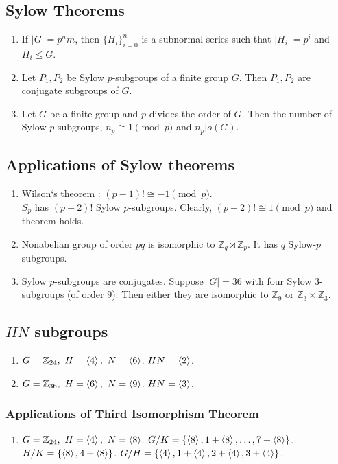 \subsection{Sylow Theorems}
\begin{enumerate}
	\item If $|G|=p^nm$, then $\{ H_i \}_{i=0}^n$ is a subnormal series such that $|H_i| = p^i$ and $H_i \le G$.
	\item Let $P_1,P_2$ be Sylow $p$-subgroups of a finite group $G$. Then $P_1,P_2$ are conjugate subgroups of $G$.
	\item Let $G$ be a finite group and $p$ divides the order of $G$.
	Then the number of Sylow $p$-subgroups, $n_p \cong 1 \pmod{p}$ and $n_p|o(G)$.
\end{enumerate}

\subsection{Applications of Sylow theorems}
\begin{enumerate}
	\item Wilson`s theorem : $(p-1)! \cong -1 \pmod{p}$.\\
	$S_p$ has $(p-2)!$ Sylow $p$-subgroups.
	Clearly, $(p-2)! \cong 1 \pmod{p}$ and theorem holds.
	\item Nonabelian group of order $pq$ is isomorphic to $\mathbb{Z}_q \rtimes \mathbb{Z}_p$. It has $q$ Sylow-$p$ subgroups.
	\item Sylow $p$-subgroups are conjugates.
		Suppose $|G|=36$ with four Sylow $3$-subgroups (of order $9$). Then either they are isomorphic to $\mathbb{Z}_9$ or $\mathbb{Z}_3 \times \mathbb{Z}_3$.
\end{enumerate}

\subsection{$HN$ subgroups}
\begin{enumerate}
	\item $G = \mathbb{Z}_{24},\ H = \left\langle 4 \right\rangle,\ N = \left\langle 6 \right\rangle$. $HN = \left\langle 2 \right\rangle$.
	\item $G = \mathbb{Z}_{36},\ H = \left\langle 6 \right\rangle,\ N = \left\langle 9 \right\rangle$. $HN = \left\langle 3 \right\rangle$.
\end{enumerate}

\subsubsection{Applications of Third Isomorphism Theorem}
\begin{enumerate}
	\item $G = \mathbb{Z}_{24},\ H = \left\langle 4 \right\rangle,\ N = \left\langle 8 \right\rangle$. 
	$G/K = \{ \left\langle 8 \right\rangle, 1 + \left\langle 8 \right\rangle, \dots, 7+\left\langle 8 \right\rangle \}$.\\
	$H/K = \{ \left\langle 8 \right\rangle, 4+\left\langle 8 \right\rangle \}$.
	$G/H = \{ \left\langle 4 \right\rangle, 1+\left\langle 4 \right\rangle, 2+\left\langle 4 \right\rangle, 3+\left\langle 4 \right\rangle \}$.
\end{enumerate}

